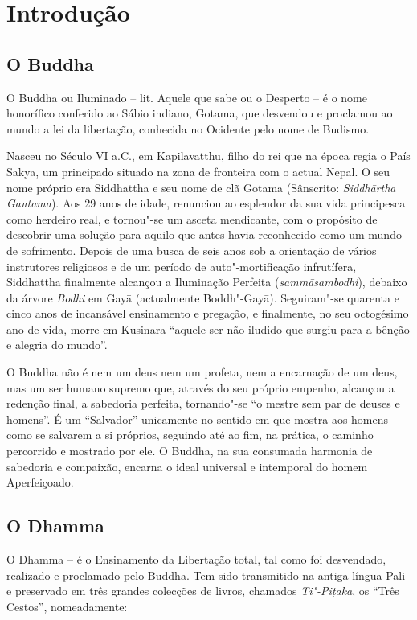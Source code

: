 \chapter{Introdução}

\section{O Buddha}

O Buddha ou Iluminado -- lit. Aquele que sabe ou o Desperto -- é o nome
honorífico conferido ao Sábio indiano, Gotama, que desvendou e proclamou ao
mundo a lei da libertação, conhecida no Ocidente pelo nome de Budismo.

Nasceu no Século VI a.C., em Kapilavatthu, filho do rei que na época regia o
País Sakya, um principado situado na zona de fronteira com o actual Nepal. O seu
nome próprio era Siddhattha e seu nome de clã Gotama (Sânscrito:
\emph{Siddhārtha Gautama}). Aos 29 anos de idade, renunciou ao esplendor da sua
vida principesca como herdeiro real, e tornou"-se um asceta mendicante, com o
propósito de descobrir uma solução para aquilo que antes havia reconhecido como
um mundo de sofrimento. Depois de uma busca de seis anos sob a orientação de
vários instrutores religiosos e de um período de auto"-mortificação infrutífera,
Siddhattha finalmente alcançou a Iluminação Perfeita (\emph{sammāsambodhi}),
debaixo da árvore \emph{Bodhi} em Gayā (actualmente Boddh"-Gayā). Seguiram"-se
quarenta e cinco anos de incansável ensinamento e pregação, e finalmente, no seu
octogésimo ano de vida, morre em Kusinara “aquele ser não iludido que surgiu
para a bênção e alegria do mundo”.

O Buddha não é nem um deus nem um profeta, nem a encarnação de um deus, mas um
ser humano supremo que, através do seu próprio empenho, alcançou a redenção
final, a sabedoria perfeita, tornando"-se “o mestre sem par de deuses e
homens”. É um “Salvador” unicamente no sentido em que mostra aos homens como
se salvarem a si próprios, seguindo até ao fim, na prática, o caminho percorrido
e mostrado por ele. O Buddha, na sua consumada harmonia de sabedoria e
compaixão, encarna o ideal universal e intemporal do homem Aperfeiçoado.

\section{O Dhamma}

O Dhamma -- é o Ensinamento da Libertação total, tal como foi desvendado, realizado e proclamado pelo Buddha. Tem sido transmitido na antiga língua Pāli e preservado em três grandes colecções de livros, chamados \emph{Ti"-Piṭaka}, os “Três Cestos”, nomeadamente:

